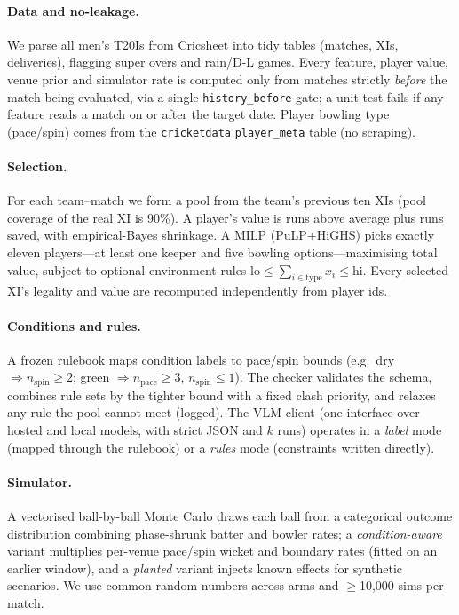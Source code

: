 \documentclass[11pt]{article}
\begin{document}
\paragraph{Data and no-leakage.} We parse all men's T20Is from Cricsheet into tidy tables (matches,
XIs, deliveries), flagging super overs and rain/D-L games. Every feature, player value, venue prior
and simulator rate is computed only from matches strictly \emph{before} the match being evaluated, via
a single \texttt{history\_before} gate; a unit test fails if any feature reads a match on or after the
target date. Player bowling type (pace/spin) comes from the \texttt{cricketdata} \texttt{player\_meta}
table (no scraping).

\paragraph{Selection.} For each team--match we form a pool from the team's previous ten XIs (pool
coverage of the real XI is 90\%). A player's value is runs above average plus runs saved, with
empirical-Bayes shrinkage. A MILP (PuLP+HiGHS) picks exactly eleven players---at least one keeper and
five bowling options---maximising total value, subject to optional environment rules
$\mathrm{lo}\le\sum_{i\in\text{type}}x_i\le\mathrm{hi}$. Every selected XI's legality and value are
recomputed independently from player ids.

\paragraph{Conditions and rules.} A frozen rulebook maps condition labels to pace/spin bounds (e.g.\
dry $\Rightarrow n_\text{spin}\ge2$; green $\Rightarrow n_\text{pace}\ge3,\,n_\text{spin}\le1$). The
checker validates the schema, combines rule sets by the tighter bound with a fixed clash priority, and
relaxes any rule the pool cannot meet (logged). The VLM client (one interface over hosted and local
models, with strict JSON and $k$ runs) operates in a \emph{label} mode (mapped through the rulebook)
or a \emph{rules} mode (constraints written directly).

\paragraph{Simulator.} A vectorised ball-by-ball Monte Carlo draws each ball from a categorical
outcome distribution combining phase-shrunk batter and bowler rates; a \emph{condition-aware} variant
multiplies per-venue pace/spin wicket and boundary rates (fitted on an earlier window), and a
\emph{planted} variant injects known effects for synthetic scenarios. We use common random numbers
across arms and $\ge$10{,}000 sims per match.
\end{document}
